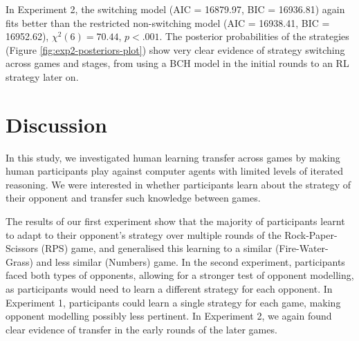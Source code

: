 \documentclass[smallextended]{svjour3}       %
\begin{document}
In Experiment 2, the switching model (AIC = 16879.97, BIC = 16936.81)
again fits better than the restricted non-switching model (AIC =
16938.41, BIC = 16952.62), \(\chi^2(6) = 70.44\), \(p < .001\). The
posterior probabilities of the strategies (Figure
\ref{fig:exp2-posteriors-plot}) show very clear evidence of strategy
switching across games and stages, from using a BCH model in the initial
rounds to an RL strategy later on.

\hypertarget{discussion}{%
\section{Discussion}\label{discussion}}

In this study, we investigated human learning transfer across games by
making human participants play against computer agents with limited
levels of iterated reasoning. We were interested in whether participants
learn about the strategy of their opponent and transfer such knowledge
between games.

The results of our first experiment show that the majority of
participants learnt to adapt to their opponent's strategy over multiple
rounds of the Rock-Paper-Scissors (RPS) game, and generalised this
learning to a similar (Fire-Water-Grass) and less similar (Numbers)
game. In the second experiment, participants faced both types of
opponents, allowing for a stronger test of opponent modelling, as
participants would need to learn a different strategy for each opponent.
In Experiment 1, participants could learn a single strategy for each
game, making opponent modelling possibly less pertinent. In Experiment
2, we again found clear evidence of transfer in the early rounds of the
later games.
\end{document}
